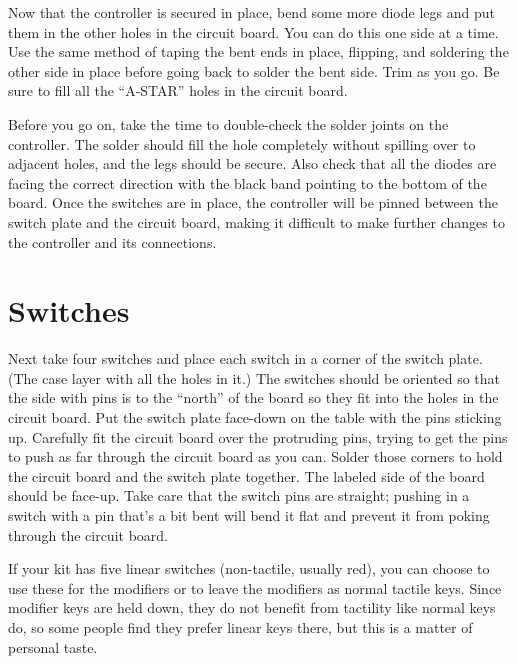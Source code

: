 \documentclass{article}
\begin{document}
Now that the controller is secured in place, bend some more diode legs
and put them in the other holes in the circuit board. You can do this
one side at a time. Use the same method of taping the bent ends in
place, flipping, and soldering the other side in place before going
back to solder the bent side. Trim as you go. Be sure to fill all the
``A-STAR'' holes in the circuit board.

\vspace{1em}

Before you go on, take the time to double-check the solder joints on
the controller. The solder should fill the hole completely without
spilling over to adjacent holes, and the legs should be secure. Also
check that all the diodes are facing the correct direction with the
black band pointing to the bottom of the board. Once the switches are
in place, the controller will be pinned between the switch plate and
the circuit board, making it difficult to make further changes to the
controller and its connections.

\section{Switches}

Next take four switches and place each switch in a corner of the
switch plate. (The case layer with all the holes in it.) The switches
should be oriented so that the side with pins is to the ``north'' of
the board so they fit into the holes in the circuit board. Put the
switch plate face-down on the table with the pins sticking
up. Carefully fit the circuit board over the protruding pins, trying
to get the pins to push as far through the circuit board as you can.
Solder those corners to hold the circuit board and the switch plate
together. The labeled side of the board should be face-up. Take care
that the switch pins are straight; pushing in a switch with a pin
that's a bit bent will bend it flat and prevent it from poking through
the circuit board.

\vspace{1em}

If your kit has five linear switches (non-tactile, usually red), you
can choose to use these for the modifiers or to leave the modifiers as
normal tactile keys. Since modifier keys are held down, they do not
benefit from tactility like normal keys do, so some people find they
prefer linear keys there, but this is a matter of personal taste.

\vspace{1em}
\end{document}
